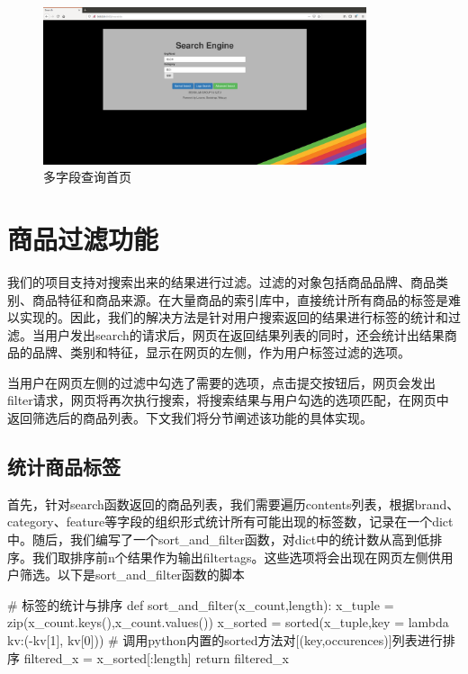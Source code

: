 \begin{figure}[htbp]
\centering
\includegraphics[width=9.5cm]{img/zlt/searchidx3.png}
\caption{多字段查询首页}
\label{fig:zlt_index3}
\end{figure}

\section{商品过滤功能}

我们的项目支持对搜索出来的结果进行过滤。过滤的对象包括商品品牌、商品类别、商品特征和商品来源。在大量商品的索引库中，直接统计所有商品的标签是难以实现的。因此，我们的解决方法是针对用户搜索返回的结果进行标签的统计和过滤。当用户发出search的请求后，网页在返回结果列表的同时，还会统计出结果商品的品牌、类别和特征，显示在网页的左侧，作为用户标签过滤的选项。

当用户在网页左侧的过滤中勾选了需要的选项，点击提交按钮后，网页会发出filter请求，网页将再次执行搜索，将搜索结果与用户勾选的选项匹配，在网页中返回筛选后的商品列表。下文我们将分节阐述该功能的具体实现。


\subsection{统计商品标签}

首先，针对search函数返回的商品列表，我们需要遍历contents列表，根据brand、category、feature等字段的组织形式统计所有可能出现的标签数，记录在一个dict中。随后，我们编写了一个sort\_and\_filter函数，对dict中的统计数从高到低排序。我们取排序前n个结果作为输出filtertags。这些选项将会出现在网页左侧供用户筛选。以下是sort\_and\_filter函数的脚本


\begin{python}
# 标签的统计与排序
def sort_and_filter(x_count,length):
    x_tuple = zip(x_count.keys(),x_count.values())
    x_sorted = sorted(x_tuple,key = lambda kv:(-kv[1], kv[0]))
    # 调用python内置的sorted方法对[(key,occurences)]列表进行排序
    filtered_x = x_sorted[:length]
    return filtered_x
\end{python}

